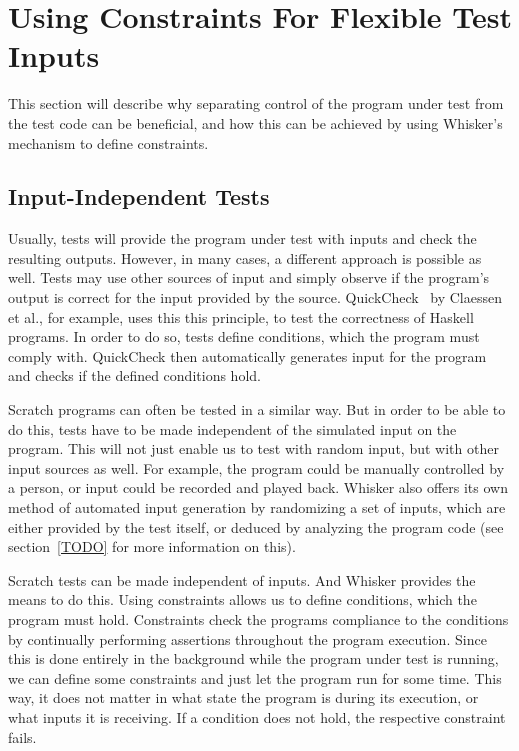 \chapter{Using Constraints For Flexible Test Inputs}%
\label{cha:using_constraints_to_enable_flexible_test_inputs}

This section will describe why separating control of the program under test from the test code can be beneficial,
and how this can be achieved by using Whisker's  mechanism to define constraints.

\section{Input-Independent Tests}

Usually, tests will provide the program under test with inputs and check the resulting outputs.
However, in many cases, a different approach is possible as well.
Tests may use other sources of input and simply observe if the program's output is correct for the input provided by the source.
QuickCheck~\cite{quickcheck} by Claessen et al., for example, uses this this principle, to test the correctness of Haskell programs.
In order to do so, tests define conditions, which the program must comply with.
QuickCheck then automatically generates input for the program and checks if the defined conditions hold.
\parspace

Scratch programs can often be tested in a similar way.
But in order to be able to do this, tests have to be made independent of the simulated input on the program.
This will not just enable us to test with random input, but with other input sources as well.
For example, the program could be manually controlled by a person, or input could be recorded and played back.
Whisker also offers its own method of automated input generation by randomizing a set of inputs,
which are either provided by the test itself, or deduced by analyzing the program code (see section~\ref{TODO} for more information on this).
\parspace

Scratch tests can be made independent of inputs.
And Whisker provides the means to do this.
Using constraints allows us to define conditions, which the program must hold.
Constraints check the programs compliance to the conditions by continually performing assertions throughout the program execution.
Since this is done entirely in the background while the program under test is running, we can define some constraints and just let the program run for some time.
This way, it does not matter in what state the program is during its execution, or what inputs it is receiving.
If a condition does not hold, the respective constraint fails.

